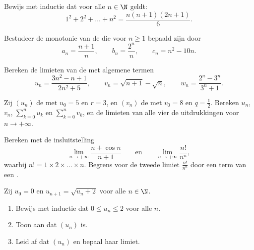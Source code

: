 \begin{exercise}[$\star$]\label{exo:g12:seq:1}
Bewijs met inductie dat voor alle $n \in \N$ geldt:
\[
1^2 + 2^2 + \dots + n^2 = \frac{n(n+1)(2n+1)}{6}.
\]
\end{exercise}

\begin{exercise}[$\star$]\label{exo:g12:seq:2}
Bestudeer de monotonie van de  die voor $n \geq 1$ bepaald zijn door
\[
a_n = \frac{n+1}{n}, \qquad
b_n = \frac{2^n}{n}, \qquad
c_n = n^2 - 10n .
\]
\end{exercise}

\begin{exercise}[$\star$]\label{exo:g12:seq:3}
Bereken de limieten van de  met algemene termen
\[
u_n = \frac{3n^2 - n + 1}{2n^2 + 5}, \qquad
v_n = \sqrt{n+1} - \sqrt{n}, \qquad
w_n = \frac{2^n - 3^n}{3^n + 1}.
\]
\end{exercise}

\begin{exercise}[$\star$]\label{exo:g12:seq:4}
Zij $(u_n)$ de  met $u_0 = 5$ en  $r = 3$, en
$(v_n)$ de  met $v_0 = 8$ en  $q = \frac{1}{2}$. Bereken
$u_n$, $v_n$, $\sum_{k=0}^{n} u_k$ en $\sum_{k=0}^{n} v_k$, en de limieten
van alle vier de uitdrukkingen voor $n \to +\infty$.
\end{exercise}

\begin{exercise}[$\star\star$]\label{exo:g12:seq:5}
Bereken met de insluitstelling
\[
\lim_{n\to+\infty} \frac{n + \cos n}{n + 1}
\qquad\text{en}\qquad
\lim_{n\to+\infty} \frac{n!}{n^n},
\]
waarbij $n! = 1 \times 2 \times \dots \times n$. Begrens voor de tweede
limiet $\frac{n!}{n^n}$ door een term van een .
\end{exercise}

\begin{exercise}[$\star\star$]\label{exo:g12:seq:6}
Zij $u_0 = 0$ en $u_{n+1} = \sqrt{u_n + 2}$ voor alle $n \in \N$.
\begin{enumerate}
  \item Bewijs met inductie dat $0 \leq u_n \leq 2$ voor alle $n$.
  \item Toon aan dat $(u_n)$  is.
  \item Leid af dat $(u_n)$  en bepaal haar limiet.
\end{enumerate}
\end{exercise}

